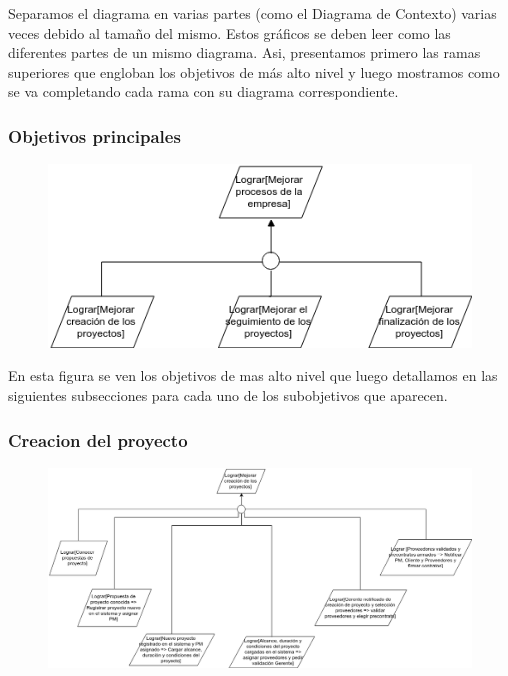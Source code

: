 Separamos el diagrama en varias partes (como el Diagrama de Contexto) varias veces debido al tamaño del mismo. Estos gráficos se deben leer como las diferentes partes de un mismo diagrama. Asi, presentamos primero las ramas superiores que engloban los objetivos de más alto nivel y luego mostramos como se va completando cada rama con su diagrama correspondiente.

\subsubsection{Objetivos principales}

\begin{figure}[H]
    \centering
    \includegraphics[width=\textwidth]{imagenes/objetivos-principales.png}
\end{figure}

En esta figura se ven los objetivos de mas alto nivel que luego detallamos en las siguientes subsecciones para cada uno de los subobjetivos que aparecen.

\subsubsection{Creacion del proyecto}

\begin{figure}[H]
    \centering
    \includegraphics[width=18cm, keepaspectratio]{imagenes/objetivos-creacion-principal.png}
\end{figure}

